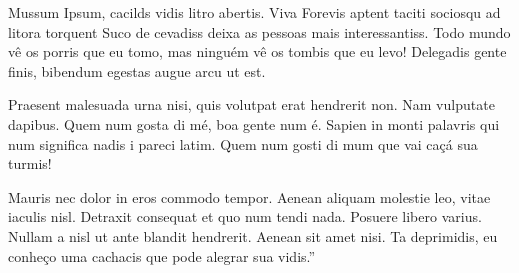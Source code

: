 Mussum Ipsum, cacilds vidis litro abertis. Viva Forevis aptent taciti 
sociosqu ad litora torquent Suco de cevadiss deixa as pessoas mais 
interessantiss. Todo mundo vê os porris que eu tomo, mas ninguém vê os 
tombis que eu levo! Delegadis gente finis, bibendum egestas augue arcu 
ut est.

Praesent malesuada urna nisi, quis volutpat erat hendrerit non. Nam 
vulputate dapibus. Quem num gosta di mé, boa gente num é. Sapien in 
monti palavris qui num significa nadis i pareci latim. Quem num gosti 
di mum que vai caçá sua turmis!

Mauris nec dolor in eros commodo tempor. Aenean aliquam molestie leo, 
vitae iaculis nisl. Detraxit consequat et quo num tendi nada. Posuere 
libero varius.  Nullam a nisl ut ante blandit hendrerit. Aenean sit 
amet nisi. Ta deprimidis, eu conheço uma cachacis que pode alegrar sua 
vidis.” 
